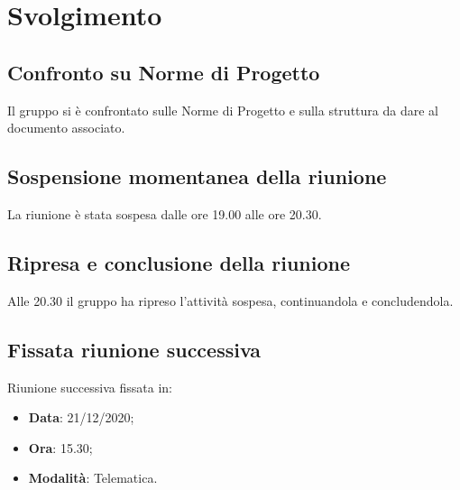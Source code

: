 \documentclass[]{article}
\begin{document}
	\newpage

	\section{Svolgimento}
		\subsection{Confronto su Norme di Progetto}
		Il gruppo si è confrontato sulle Norme di Progetto e sulla struttura da dare al documento associato.

		\subsection{Sospensione momentanea della riunione}
		La riunione è stata sospesa dalle ore 19.00 alle ore 20.30.
		
		\subsection{Ripresa e conclusione della riunione}
		Alle 20.30 il gruppo ha ripreso l'attività sospesa, continuandola e concludendola.

		\subsection{Fissata riunione successiva}
		Riunione successiva fissata in:
		\begin{itemize}
			\item \textbf{Data}: 21/12/2020;
			\item \textbf{Ora}: 15.30;
			\item \textbf{Modalità}: Telematica.
		\end{itemize}

	
\end{document}
